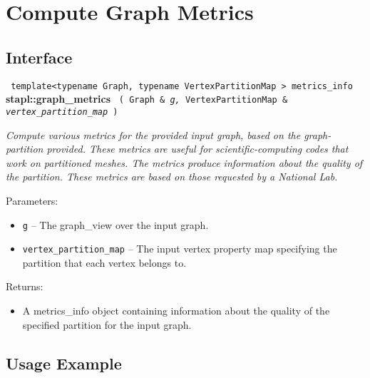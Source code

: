 
\section{ Compute Graph Metrics}
\label{sec-graf-metrics-alg}

\subsection{Interface} \label{sec-graf-metrics-alg-inter}

\noindent
\texttt{%
template<typename Graph, typename VertexPartitionMap >
\newline
metrics\_info 
}
\newline
\textbf{stapl::graph\_metrics}%
\newline
\texttt{%
(
Graph \&
\textit{g,}%
VertexPartitionMap \&
\textit{vertex\_partition\_map}%
)     
}
\vspace{0.4cm}

\textit{
Compute various metrics for the provided input graph, based on the graph-partition provided.  
These metrics are useful for scientific-computing codes that work on partitioned meshes. The metrics produce information about the quality of the partition. 
These metrics are based on those requested by a National Lab.
}
\vspace{0.4cm}

Parameters:
\begin{itemize}
\item
\texttt{g} --
The graph\_view over the input graph.
\item
\texttt{vertex\_partition\_map} --
The input vertex property map specifying the partition that each vertex belongs to.
\end{itemize}

Returns:
\begin{itemize}
\item
A metrics\_info object containing information about the quality of the specified partition for the input graph. 
\end{itemize}

\subsection{Usage Example} \label{sec-graf-metrics-alg-use}

